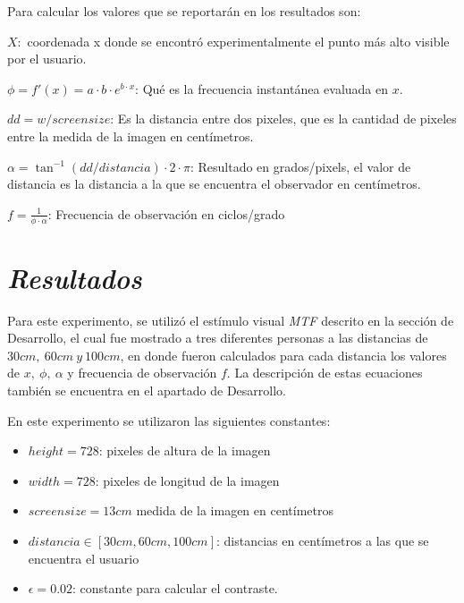 \documentclass[conference]{IEEEtran}
\def\shadowLine{\vspace{3mm}}
\begin{document}
Para calcular los valores que se reportarán en los resultados son:

$X:$ coordenada x donde se encontró experimentalmente el punto más alto visible por el usuario.

$\phi=f'(x)= a\cdot b\cdot e^{b\cdot x}$: Qué es la frecuencia instantánea evaluada en $x$.

$dd = w/screensize$: Es la distancia entre dos pixeles, que es la cantidad de pixeles entre la medida de la imagen en centímetros.

$\alpha= \tan^{-1}(dd/distancia)\cdot 2\cdot \pi$: Resultado en grados/pixels, el valor de distancia es la distancia a la que se encuentra el observador en centímetros.

\shadowLine
$f=\displaystyle\frac{1}{\phi\cdot\alpha}$: Frecuencia de observación en ciclos/grado


\section{\textit{Resultados}}

Para este experimento, se utilizó el estímulo visual \textit{MTF} descrito en la sección de Desarrollo, el cual fue mostrado a tres diferentes personas a las distancias de $30cm,\ 60cm\ y\ 100cm$, en donde fueron calculados para cada distancia los valores de $x,\ \phi,\ \alpha$ y frecuencia de observación $f$. La descripción de estas ecuaciones también se encuentra en el apartado de Desarrollo.

En este experimento se utilizaron las siguientes constantes:
\begin{itemize}
\item $height = 728$: pixeles de altura de la imagen
\item $width = 728$: pixeles de longitud de la imagen
\item $screensize=13cm$ medida de la imagen en centímetros
\item $distancia\in [30cm,60cm,100cm]$: distancias en centímetros a las que se encuentra el usuario
\item $\epsilon=0.02$: constante para calcular el contraste.
\end{itemize}
\end{document}
